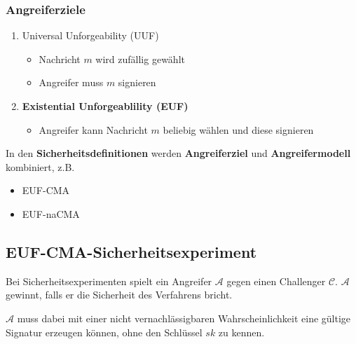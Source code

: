\documentclass[12pt,A4]{extarticle}
\newcommand{\highlight}[1]{\textcolor{highlightColor}{\textbf{#1}}}
\begin{document}
\subsubsection{Angreiferziele}
\begin{enumerate}
  \item{Universal Unforgeability (UUF)
              \begin{itemize}
                \item{Nachricht $m$ wird zufällig gewählt}
                \item{Angreifer muss $m$ signieren}
              \end{itemize}
        }
  \item{\highlight{Existential Unforgeablility (EUF)}
              \begin{itemize}
                \item{Angreifer kann Nachricht $m$ beliebig wählen und diese signieren}
              \end{itemize}
        }
\end{enumerate}

In den \textbf{Sicherheitsdefinitionen} werden \textbf{Angreiferziel} und \textbf{Angreifermodell} kombiniert, z.B.
\begin{itemize}
  \item{EUF-CMA}
  \item{EUF-naCMA}
\end{itemize}

\subsection{EUF-CMA-Sicherheitsexperiment}\label{sec:euf-cma}
Bei Sicherheitsexperimenten spielt ein Angreifer $\mathcal{A}$ gegen einen Challenger $\mathcal{C}$. $\mathcal{A}$ gewinnt, falls er die Sicherheit des Verfahrens bricht.\par
$\mathcal{A}$ muss dabei mit einer nicht vernachlässigbaren Wahrscheinlichkeit eine gültige Signatur erzeugen können, ohne den Schlüssel $sk$ zu kennen.
\end{document}
